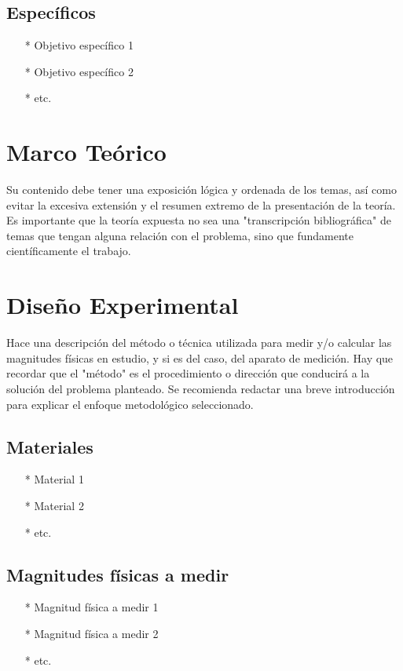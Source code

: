 \documentclass[osajnl,twocolumn,showpacs,superscriptaddress,10pt]{revtex4-1}
\begin{document}
\subsection{Específicos}
\begin{itemize}
\item[*] Objetivo específico 1
\item[*] Objetivo específico 2
\item[*] etc.
\end{itemize}
 
\section{Marco Teórico}

Su contenido debe tener una exposición lógica y ordenada de los temas, así como
evitar la excesiva extensión y el resumen extremo de la presentación de la teoría. Es
importante que la teoría expuesta no sea una "transcripción bibliográfica" de temas
que tengan alguna relación con el problema, sino que fundamente científicamente el
trabajo.\\

\section{Diseño Experimental}

Hace una descripción del método o técnica utilizada para medir y/o calcular las
magnitudes físicas en estudio, y si es del caso, del aparato de medición. Hay que
recordar que el "método" es el procedimiento o dirección que conducirá a la solución
del problema planteado. Se recomienda redactar una breve introducción para explicar
el enfoque metodológico seleccionado.\\

\subsection{Materiales}
\begin{itemize}
\item[*] Material 1
\item[*] Material 2
\item[*] etc.

\end{itemize}


\subsection{Magnitudes físicas a medir}
\begin{itemize}
\item[*] Magnitud física a medir 1
\item[*] Magnitud física a medir 2
\item[*] etc.
\end{itemize}
\end{document}

